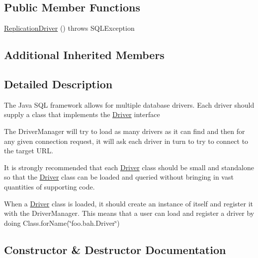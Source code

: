 \subsection*{Public Member Functions}
\begin{DoxyCompactItemize}
\item 
\mbox{\hyperlink{classcom_1_1mysql_1_1jdbc_1_1_replication_driver_afd4063a58fbb649b53dea5e47f9c313e}{Replication\+Driver}} ()  throws S\+Q\+L\+Exception 
\end{DoxyCompactItemize}
\subsection*{Additional Inherited Members}


\subsection{Detailed Description}
The Java S\+QL framework allows for multiple database drivers. Each driver should supply a class that implements the \mbox{\hyperlink{classcom_1_1mysql_1_1jdbc_1_1_driver}{Driver}} interface

The Driver\+Manager will try to load as many drivers as it can find and then for any given connection request, it will ask each driver in turn to try to connect to the target U\+RL.

It is strongly recommended that each \mbox{\hyperlink{classcom_1_1mysql_1_1jdbc_1_1_driver}{Driver}} class should be small and standalone so that the \mbox{\hyperlink{classcom_1_1mysql_1_1jdbc_1_1_driver}{Driver}} class can be loaded and queried without bringing in vast quantities of supporting code.

When a \mbox{\hyperlink{classcom_1_1mysql_1_1jdbc_1_1_driver}{Driver}} class is loaded, it should create an instance of itself and register it with the Driver\+Manager. This means that a user can load and register a driver by doing Class.\+for\+Name(\char`\"{}foo.\+bah.\+Driver\char`\"{}) 

\subsection{Constructor \& Destructor Documentation}
\mbox{\label{classcom_1_1mysql_1_1jdbc_1_1_replication_driver_afd4063a58fbb649b53dea5e47f9c313e}} 

